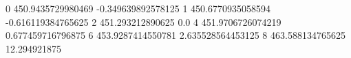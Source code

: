 0 450.9435729980469 -0.349639892578125
1 450.6770935058594 -0.616119384765625
2 451.293212890625 0.0
4 451.9706726074219 0.677459716796875
6 453.9287414550781 2.635528564453125
8 463.588134765625 12.294921875
